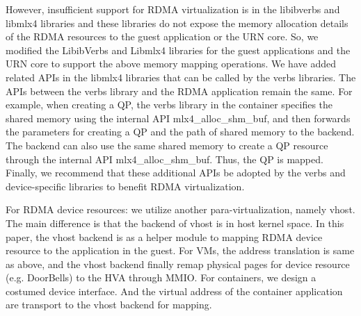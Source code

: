   However, insufficient support for RDMA virtualization is in the libibverbs and libmlx4 libraries and these libraries do not expose the memory allocation details of the RDMA resources to the guest application or the URN core. So, we modified the LibibVerbs and Libmlx4 libraries for the guest applications and the URN core to support the above memory mapping operations. We have added related APIs in the libmlx4 libraries that can be called by the verbs libraries. The APIs between the verbs library and the RDMA application remain the same. For example, when creating a QP, the verbs library in the container specifies the shared memory using the internal API mlx4\_alloc\_shm\_buf, and then forwards the parameters for creating a QP and the path of shared memory to the backend. The backend can also use the same shared memory to create a QP resource through the internal API mlx4\_alloc\_shm\_buf. Thus, the QP is mapped. Finally, we recommend that these additional APIs be adopted by the verbs and device-specific libraries to benefit RDMA virtualization.
  
 For RDMA device resources: we utilize another para-virtualization, namely vhost. The main difference is that the backend of vhost is in host kernel space. In this paper, the vhost backend is as a helper module to mapping RDMA device resource to the application in the guest. 
 For VMs, the address translation is same as above, and the vhost backend finally remap physical pages for device resource (e.g. DoorBells) to the HVA through MMIO. For containers, we design a costumed device interface. And the virtual address of the container application are transport to the vhost backend for mapping. 
 

